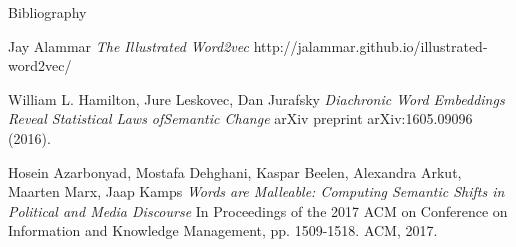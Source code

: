 \documentclass[10pt]{beamer}
\begin{document}

\begin{frame}{Bibliography}
  \begin{thebibliography}{}
    Jay Alammar
    \textit{The Illustrated Word2vec}
    http://jalammar.github.io/illustrated-word2vec/
    
      William L. Hamilton, Jure Leskovec, Dan Jurafsky
      \textit{Diachronic Word Embeddings Reveal Statistical Laws ofSemantic Change}
       arXiv preprint arXiv:1605.09096 (2016).
    
    Hosein Azarbonyad, Mostafa Dehghani, Kaspar Beelen, Alexandra Arkut, Maarten Marx, Jaap Kamps
    \textit{Words are Malleable: Computing Semantic Shifts in Political and Media Discourse}
    In Proceedings of the 2017 ACM on Conference on Information and Knowledge Management, pp. 1509-1518. ACM, 2017.
    
  \end{thebibliography} 
\end{frame}
\end{document}
